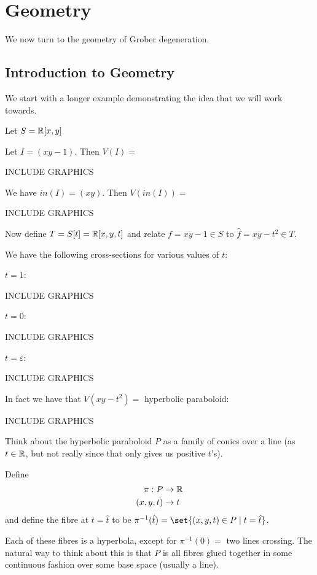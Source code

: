 \newpage
\section{Geometry}


We now turn to the geometry of Grober degeneration.

\subsection{Introduction to Geometry}

We start with a longer example demonstrating the idea that we will work towards.


Let $S = \mathbb{R} [x,y ]$

Let $I = (xy -1)$.
Then $V(I) = $

INCLUDE GRAPHICS

We have $in(I) = (xy) $. Then $V(in(I)) = $

INCLUDE GRAPHICS

Now define $T = S[t] = \mathbb{R} [x,y,t]$ and relate $f = xy-1 \in S$ to $\hat{f} = xy - t^2 \in T$.

We have the following cross-sections for various values of $t$:

$t = 1$:

INCLUDE GRAPHICS

$t = 0$:

INCLUDE GRAPHICS

$t = \varepsilon$:

INCLUDE GRAPHICS

In fact we have that $V(xy- t^2) = $ hyperbolic paraboloid:

INCLUDE GRAPHICS

Think about the hyperbolic paraboloid $P$ as a family of conics over a line (as $t \in \mathbb{R}$, but not really since that only gives us positive $t$'s).

\begin{definition}
Define 
\begin{align*}
    \pi : P &\to \mathbb{R}\\
    (x,y,t) &\to t
\end{align*}
and define the fibre at $t = \hat{t}$ to be $\pi^{-1} (\hat{t}) = \set{ (x,y,t) \in P \mid t = \hat{t} }$.
\end{definition}

Each of these fibres is a hyperbola, except for $\pi^{-1}(0) = $ two lines crossing. The natural way to think about this is that $P$ is all fibres glued together in some continuous fashion over some base space (usually a line).

